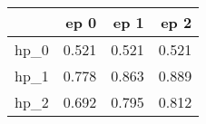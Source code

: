 \begin{tabular}{lrrr}
\toprule
{} &   ep 0 &   ep 1 &   ep 2 \\
\midrule
hp\_0 &  0.521 &  0.521 &  0.521 \\
hp\_1 &  0.778 &  0.863 &  0.889 \\
hp\_2 &  0.692 &  0.795 &  0.812 \\
\bottomrule
\end{tabular}
